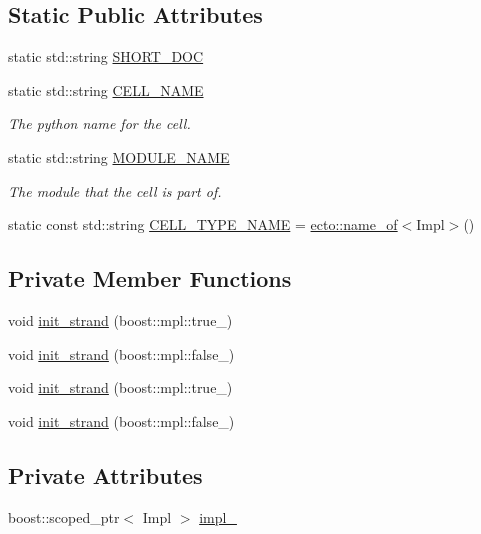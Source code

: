 \subsection*{Static Public Attributes}
\begin{DoxyCompactItemize}
\item 
static std\-::string \hyperlink{structecto_1_1cell___a6a5b6bd083a48acd35ffcf83dacff2f1}{S\-H\-O\-R\-T\-\_\-\-D\-O\-C}
\item 
static std\-::string \hyperlink{structecto_1_1cell___aaa9154887542b8d7152f8199e9c6c9bd}{C\-E\-L\-L\-\_\-\-N\-A\-M\-E}
\begin{DoxyCompactList}\small\item\em The python name for the cell. \end{DoxyCompactList}\item 
static std\-::string \hyperlink{structecto_1_1cell___ab81cf6649132223f620b739a57db04db}{M\-O\-D\-U\-L\-E\-\_\-\-N\-A\-M\-E}
\begin{DoxyCompactList}\small\item\em The module that the cell is part of. \end{DoxyCompactList}\item 
static const std\-::string \hyperlink{structecto_1_1cell___a26e158738e4e4c8f0ddb64efce30d8d3}{C\-E\-L\-L\-\_\-\-T\-Y\-P\-E\-\_\-\-N\-A\-M\-E} = \hyperlink{namespaceecto_a980294f61090496ef65bc6b201f38944}{ecto\-::name\-\_\-of}$<$Impl$>$()
\end{DoxyCompactItemize}
\subsection*{Private Member Functions}
\begin{DoxyCompactItemize}
\item 
void \hyperlink{structecto_1_1cell___abb452935616e25bfbb49b77de3f5bcce}{init\-\_\-strand} (boost\-::mpl\-::true\-\_\-)
\item 
void \hyperlink{structecto_1_1cell___a86ac0ef672f44090b0f5e9bf3a8b56dc}{init\-\_\-strand} (boost\-::mpl\-::false\-\_\-)
\item 
void \hyperlink{structecto_1_1cell___abb452935616e25bfbb49b77de3f5bcce}{init\-\_\-strand} (boost\-::mpl\-::true\-\_\-)
\item 
void \hyperlink{structecto_1_1cell___a86ac0ef672f44090b0f5e9bf3a8b56dc}{init\-\_\-strand} (boost\-::mpl\-::false\-\_\-)
\end{DoxyCompactItemize}
\subsection*{Private Attributes}
\begin{DoxyCompactItemize}
\item 
boost\-::scoped\-\_\-ptr$<$ Impl $>$ \hyperlink{structecto_1_1cell___aefbb595c18abd0479e06a6f879dac961}{impl\-\_\-}
\end{DoxyCompactItemize}

